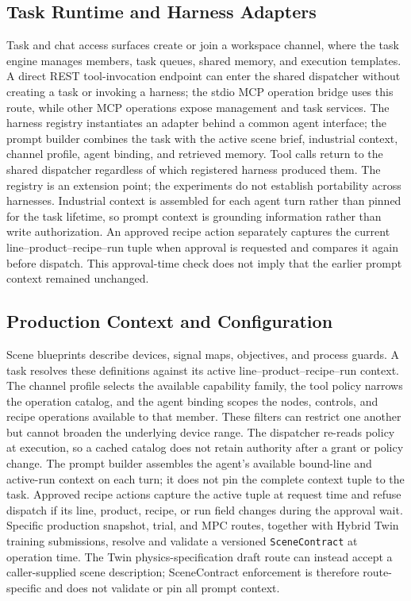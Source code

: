 \subsection{Task Runtime and Harness Adapters}
Task and chat access surfaces create or join a workspace channel, where the
task engine manages members, task queues, shared memory, and execution
templates. A direct REST tool-invocation endpoint can enter the shared
dispatcher without creating a task or invoking a harness; the stdio MCP
operation bridge uses this route, while other MCP operations expose management
and task services.
The harness registry instantiates an adapter behind a common agent interface;
the prompt builder combines the task with the active scene brief, industrial
context, channel profile, agent binding, and retrieved memory. Tool calls
return to the shared dispatcher regardless of which registered harness
produced them. The registry is an extension point; the experiments do not
establish portability across harnesses. Industrial context is assembled for
each agent turn rather than pinned for the task lifetime, so prompt context is
grounding information rather than write authorization. An approved recipe
action separately captures the current line--product--recipe--run tuple when
approval is requested and compares it again before dispatch. This
approval-time check does not imply that the earlier prompt context remained
unchanged.

\subsection{Production Context and Configuration}
Scene blueprints describe devices, signal maps, objectives, and process
guards. A task resolves these definitions against its active
line--product--recipe--run context. The channel profile selects the available
capability family, the tool policy narrows the operation catalog, and the
agent binding scopes the nodes, controls, and recipe operations available to
that member. These filters can restrict one another but cannot broaden the
underlying device range. The dispatcher re-reads policy at execution, so a
cached catalog does not retain authority after a grant or policy change. The
prompt builder assembles the agent's available bound-line and active-run
context on each turn; it does not pin the complete context tuple to the task.
Approved recipe actions capture the active tuple at request time and refuse
dispatch if its line, product, recipe, or run field changes during the
approval wait.
Specific production snapshot, trial, and MPC routes, together with Hybrid Twin
training submissions, resolve and validate a versioned \texttt{SceneContract}
at operation time. The Twin physics-specification draft route can instead
accept a caller-supplied scene description; SceneContract enforcement is
therefore route-specific and does not validate or pin all prompt context.


